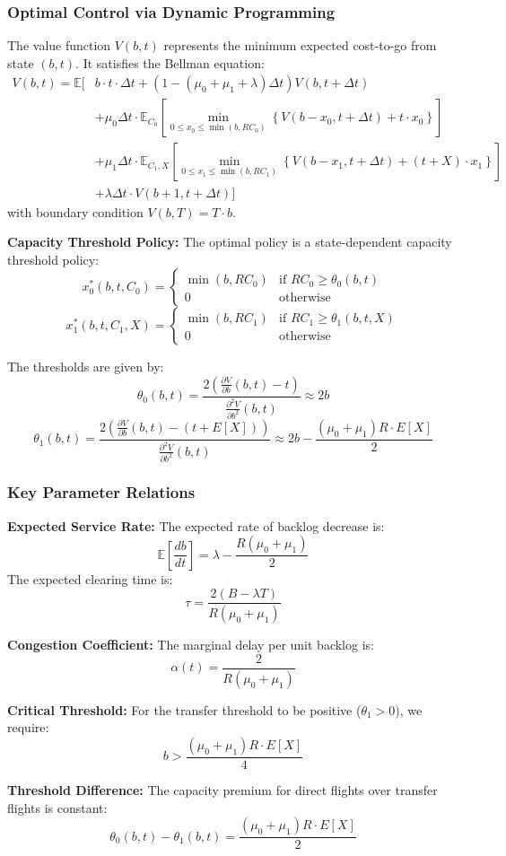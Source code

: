\documentclass[opre,sglanonrev]{informs4}
\begin{document}
{\subsubsection{Optimal Control via Dynamic Programming}

The value function \( V(b, t) \) represents the minimum expected cost-to-go from state \( (b, t) \). It satisfies the Bellman equation:
\begin{align*}
V(b, t) = \mathbb{E}\bigg[ & b \cdot t \cdot \Delta t + (1 - (\mu_0 + \mu_1 + \lambda) \Delta t) V(b, t + \Delta t) \\
& + \mu_0 \Delta t \cdot \mathbb{E}_{C_0} \left[ \min_{0 \leq x_0 \leq \min(b, RC_0)} \left\{ V(b - x_0, t + \Delta t) + t \cdot x_0 \right\} \right] \\
& + \mu_1 \Delta t \cdot \mathbb{E}_{C_1, X} \left[ \min_{0 \leq x_1 \leq \min(b, RC_1)} \left\{ V(b - x_1, t + \Delta t) + (t + X) \cdot x_1 \right\} \right] \\
& + \lambda \Delta t \cdot V(b + 1, t + \Delta t) \bigg]
\end{align*}
with boundary condition \( V(b, T) = T \cdot b \).

\textbf{Capacity Threshold Policy:} The optimal policy is a state-dependent capacity threshold policy:
\[
x_0^*(b, t, C_0) = \begin{cases}
\min(b, RC_0) & \text{if } RC_0 \geq \theta_0(b, t) \\
0 & \text{otherwise}
\end{cases}
\]
\[
x_1^*(b, t, C_1, X) = \begin{cases}
\min(b, RC_1) & \text{if } RC_1 \geq \theta_1(b, t, X) \\
0 & \text{otherwise}
\end{cases}
\]

The thresholds are given by:
\[
\theta_0(b, t) = \frac{2 \left( \frac{\partial V}{\partial b}(b, t) - t \right)}{\frac{\partial^2 V}{\partial b^2}(b, t)} \approx 2b
\]
\[
\theta_1(b, t) = \frac{2 \left( \frac{\partial V}{\partial b}(b, t) - (t + E[X]) \right)}{\frac{\partial^2 V}{\partial b^2}(b, t)} \approx 2b - \frac{(\mu_0 + \mu_1) R \cdot E[X]}{2}
\]

\subsubsection{Key Parameter Relations}

\textbf{Expected Service Rate:} The expected rate of backlog decrease is:
\[
\mathbb{E}\left[\frac{db}{dt}\right] = \lambda - \frac{R(\mu_0 + \mu_1)}{2}
\]
The expected clearing time is:
\[
\tau = \frac{2(B - \lambda T)}{R(\mu_0 + \mu_1)}
\]

\textbf{Congestion Coefficient:} The marginal delay per unit backlog is:
\[
\alpha(t) = \frac{2}{R(\mu_0 + \mu_1)}
\]

\textbf{Critical Threshold:} For the transfer threshold to be positive (\( \theta_1 > 0 \)), we require:
\[
b > \frac{(\mu_0 + \mu_1) R \cdot E[X]}{4}
\]

\textbf{Threshold Difference:} The capacity premium for direct flights over transfer flights is constant:
\[
\theta_0(b, t) - \theta_1(b, t) = \frac{(\mu_0 + \mu_1) R \cdot E[X]}{2}
\]
}
\end{document}
